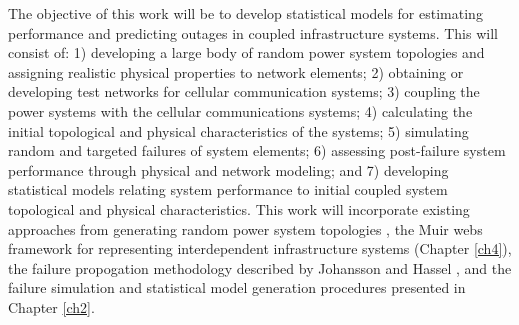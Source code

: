 The objective of this work will be to develop statistical models for estimating performance and predicting outages in coupled infrastructure systems.  This will consist of:  1) developing a large body of random power system topologies and assigning realistic physical properties to network elements; 2) obtaining or developing test networks for cellular communication systems; 3) coupling the power systems with the cellular communications systems; 4) calculating the initial topological and physical characteristics of the systems; 5) simulating random and targeted failures of system elements; 6) assessing post-failure system performance through physical and network modeling; and 7) developing statistical models relating system performance to initial coupled system topological and physical characteristics.  This work will incorporate existing approaches from generating random power system topologies \cite{Wang2008, Ouyang2011a}, the Muir webs framework for representing interdependent infrastructure systems (Chapter \ref{ch4}), the failure propogation methodology described by Johansson and Hassel \cite{Johansson2010a}, and the failure simulation and statistical model generation procedures presented in Chapter \ref{ch2}.


